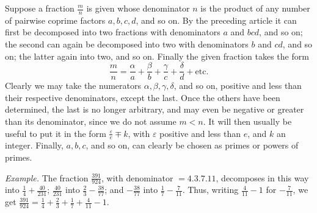 Suppose a fraction \(\frac mn\) is given whose denominator \(n\) is the product of any number of pairwise coprime factors \(a,b,c,d\), and so on. By the preceding article it can first be decomposed into two fractions with denominators \(a\) and \(bcd\), and so on; the second can again be decomposed into two with denominators \(b\) and \(cd\), and so on; the latter again into two, and so on. Finally the given fraction takes the form \[\frac mn=\frac\alpha a+\frac\beta b+\frac\gamma c+\frac\delta d+\text{etc.}\]
Clearly we may take the numerators \(\alpha,\beta,\gamma,\delta\), and so on, positive and less than their respective denominators, except the last. Once the others have been determined, the last is no longer arbitrary, and may even be negative or greater than its denominator, since we do not assume \(m<n\). It will then usually be useful to put it in the form \(\frac\varepsilon e\mp k\), with \(\varepsilon\) positive and less than \(e\), and \(k\) an integer. Finally, \(a,b,c\), and so on, can clearly be chosen as primes or powers of primes.

\textit{Example.} The fraction \(\frac{391}{924}\), with denominator \(=4.3.7.11\), decomposes in this way into \(\frac14+\frac{40}{231}\); \(\frac{40}{231}\) into \(\frac23-\frac{38}{77}\); and \(-\frac{38}{77}\) into \(\frac17-\frac7{11}\). Thus, writing \(\frac4{11}-1\) for \(-\frac7{11}\), we get \(\frac{391}{924}=\frac14+\frac23+\frac17+\frac4{11}-1\).

